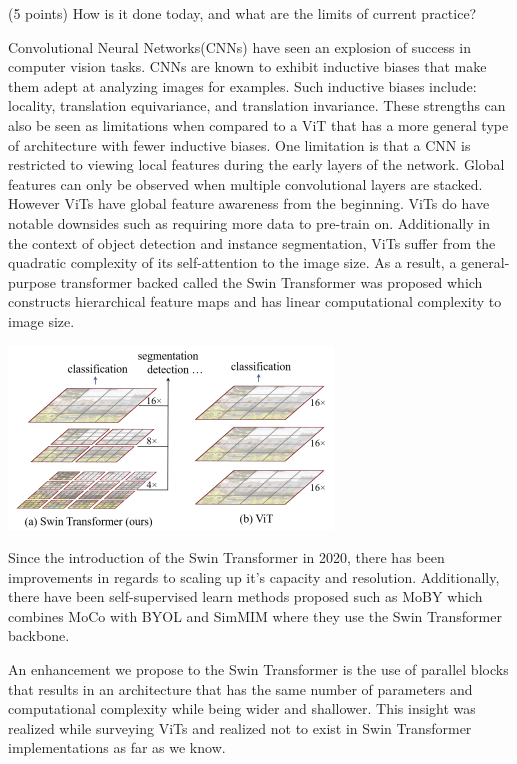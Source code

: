\documentclass[10pt,twocolumn,letterpaper]{article}
\begin{document}
(5 points) How is it done today, and what are the limits of current practice?

Convolutional Neural Networks(CNNs) have seen an explosion of success in computer vision tasks. CNNs are known to exhibit inductive biases that make them adept at analyzing images for examples. Such inductive biases include: locality, translation equivariance, and translation invariance. These strengths can also be seen as limitations when compared to a ViT that has a more general type of architecture with fewer inductive biases. One limitation is that a CNN is restricted to viewing local features during the early layers of the network. Global features can only be observed when multiple convolutional layers are stacked. However ViTs have global feature awareness from the beginning. ViTs do have notable downsides such as requiring more data to pre-train on.  Additionally in the context of object detection and instance segmentation, ViTs suffer from the quadratic complexity of its self-attention to the image size. As a result, a general-purpose transformer backed called the Swin Transformer\cite{liu2021swin} was proposed which constructs hierarchical feature maps and has linear computational complexity to image size.

\includegraphics[width=0.8\linewidth]{docs/latex/images/SwinVsViT.png}
\caption{}


Since the introduction of the Swin Transformer in 2020, there has been improvements in regards to scaling up it's capacity and resolution\cite{liu2021swinV2}. Additionally, there have been self-supervised learn methods proposed such as MoBY\cite{xie2021moby} which combines MoCo\cite{he2020momentum}\cite{chen2020improved} with BYOL\cite{grill2020bootstrap} and SimMIM\cite{xie2021simmim} where they use the Swin Transformer backbone.

An enhancement we propose to the Swin Transformer is the use of parallel blocks that results in an architecture that has the same number of parameters and computational complexity while being wider and shallower. This insight was realized while surveying ViTs\cite{touvron2022three} and realized not to exist in Swin Transformer implementations as far as we know.
\end{document}
